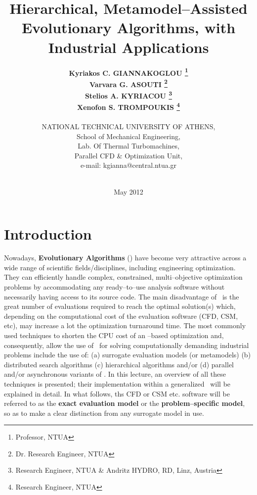 \documentclass{vki_ls}
\title{Hierarchical, Metamodel--Assisted Evolutionary Algorithms, with 
Industrial Applications}
\author{
{\bf Kyriakos C. GIANNAKOGLOU	\thanks{Professor, NTUA}} \\
{\bf Varvara  G. ASOUTI		\thanks{Dr. Research Engineer, NTUA}} \\
{\bf Stelios  A. KYRIACOU	\thanks{Research Engineer, NTUA \& Andritz HYDRO, RD, Linz, Austria}} \\
{\bf Xenofon  S. TROMPOUKIS	\thanks{Research Engineer, NTUA}} \\
\\
NATIONAL TECHNICAL UNIVERSITY OF ATHENS,\\
School of Mechanical Engineering, \\
Lab. Of Thermal Turbomachines,  \\
Parallel CFD \& Optimization Unit, \\
e-mail: kgianna@central.ntua.gr
\\
\\
}
\date{May 2012}
\begin{document}

\maketitle

\setcounter{page}{1}
\clearpage
\tableofcontents
\clearpage{\pagestyle{empty}\cleardoublepage}

\pagestyle{fancy}
\renewcommand{\footrulewidth}{0.3pt}
\renewcommand{\headheight}{15.0pt}
\newcommand{\san}{\small}
\fancyhf{}
\fancyhead[LE,RO]{\bf \thepage}
\fancyhead[LO]{\small \rightmark}
\fancyhead[RE]{\small \leftmark}
%
\section[Introduction]
{Introduction}
\label{s:intro}


Nowadays, \textbf{Evolutionary Algorithms} (\EAs) have become very attractive across a wide range of scientific fields/disciplines, including engineering optimization.
They can efficiently handle complex, constrained, multi--objective optimization problems by accommodating any ready--to--use analysis software without necessarily having access to its source code.
The main disadvantage of \EAs\ is the great number of evaluations required to reach the optimal solution(s) which, depending on the computational cost of the evaluation software (CFD, CSM, etc), may  increase a lot the optimization turnaround time. 
The most commonly used techniques to shorten the CPU cost of an \EA--based optimization and, consequently, allow the use of \EAs\ for solving computationally demanding industrial problems include the use of:
(a) surrogate evaluation models (or metamodels) (b) distributed search algorithms (c) hierarchical algorithms and/or (d) parallel and/or asynchronous variants of \EAs. 
In this lecture, an overview of all these techniques is presented; their implementation within a generalized \EA\ will be explained in detail. 
In what follows, ths CFD or CSM etc. software will be referred to as the \textbf{exact evaluation model} or the \textbf{problem--specific model}, so as to make a clear distinction from any surrogate model in use.
\end{document}
